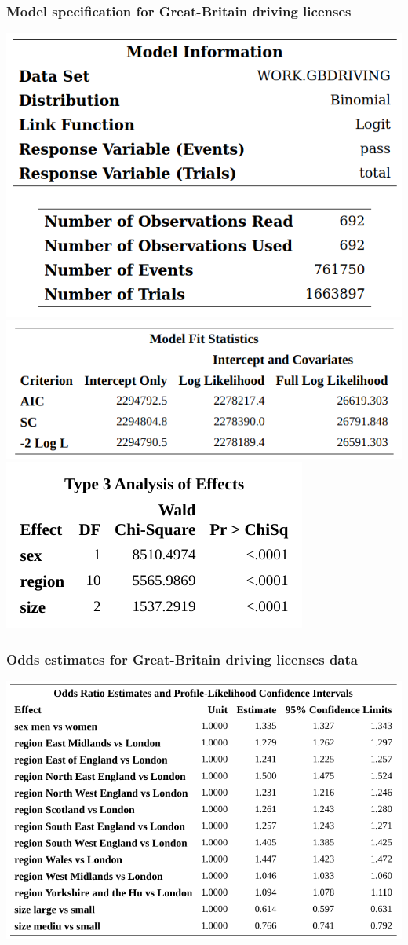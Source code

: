 \documentclass{beamer}
\begin{document}
\begin{frame}
 \frametitle{Model specification for Great-Britain driving licenses}
 \begin{center}
 \includegraphics[width = 0.45\linewidth]{img/c4/slides8-e19}
  \includegraphics[width = 0.6\linewidth]{img/c4/slides8-e20}
  \includegraphics[width = 0.39\linewidth]{img/c4/slides8-e21}
 \end{center}

\end{frame}

\begin{frame}
 \frametitle{Odds estimates for Great-Britain driving licenses data}
 \begin{center}
 \includegraphics[width = 0.9\linewidth]{img/c4/slides8-e22}
 \end{center}
\end{frame}
\end{document}
